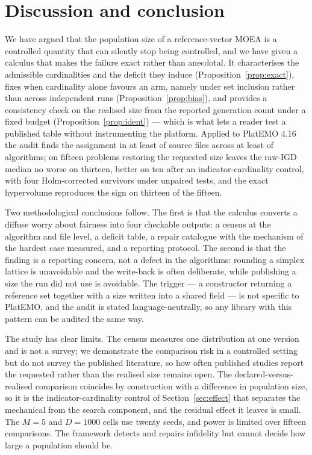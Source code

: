 \documentclass{SCIS2026}
\begin{document}
\section{Discussion and conclusion}
\label{sec:conclusion}
We have argued that the population size of a reference-vector MOEA is a controlled quantity that can silently stop being controlled, and we have given a calculus that makes the failure exact rather than anecdotal. It characterises the admissible cardinalities and the deficit they induce (Proposition~\ref{prop:exact}), fixes when cardinality alone favours an arm, namely under set inclusion rather than across independent runs (Proposition~\ref{prop:bias}), and provides a consistency check on the realised size from the reported generation count under a fixed budget (Proposition~\ref{prop:ident}) --- which is what lets a reader test a published table without instrumenting the platform. Applied to PlatEMO 4.16 the audit finds the assignment in at least \nFilesAffected{} of \nFilesTotal{} source files across at least \nAlgAffected{} of \nAlgTotal{} algorithms; on fifteen problems restoring the requested size leaves the raw-IGD median no worse on thirteen, better on ten after an indicator-cardinality control, with four Holm-corrected survivors under unpaired tests, and the exact hypervolume reproduces the sign on thirteen of the fifteen.

Two methodological conclusions follow. The first is that the calculus converts a diffuse worry about fairness into four checkable outputs: a census at the algorithm and file level, a deficit table, a repair catalogue with the mechanism of the hardest case measured, and a reporting protocol. The second is that the finding is a reporting concern, not a defect in the algorithms: rounding a simplex lattice is unavoidable and the write-back is often deliberate, while publishing a size the run did not use is avoidable. The trigger --- a constructor returning a reference set together with a size written into a shared field --- is not specific to PlatEMO, and the audit is stated language-neutrally, so any library with this pattern can be audited the same way.

The study has clear limits. The census measures one distribution at one version and is not a survey; we demonstrate the comparison risk in a controlled setting but do not survey the published literature, so how often published studies report the requested rather than the realised size remains open. The declared-versus-realised comparison coincides by construction with a difference in population size, so it is the indicator-cardinality control of Section~\ref{sec:effect} that separates the mechanical from the search component, and the residual effect it leaves is small. The $M=5$ and $D=1000$ cells use twenty seeds, and power is limited over fifteen comparisons. The framework detects and repairs infidelity but cannot decide how large a population should be.
\end{document}
